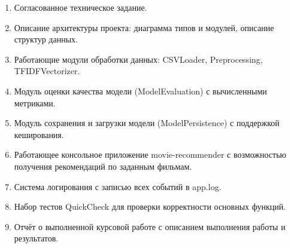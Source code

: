 \begin{enumerate}
    \item Согласованное техническое задание.
    
    \item Описание архитектуры проекта: диаграмма типов и модулей, описание структур данных.
    
    \item Работающие модули обработки данных: CSVLoader, Preprocessing, TFIDFVectorizer.
    
    \item Модуль оценки качества модели (ModelEvaluation) с вычисленными метриками.
    
    \item Модуль сохранения и загрузки модели (ModelPersistence) с поддержкой кеширования.
    
    \item Работающее консольное приложение movie-recommender с возможностью получения рекомендаций по заданным фильмам.
    
    \item Система логирования с записью всех событий в app.log.
    
    \item Набор тестов QuickCheck для проверки корректности основных функций.
    
    \item Отчёт о выполненной курсовой работе с описанием выполнения работы и результатов.
\end{enumerate}
